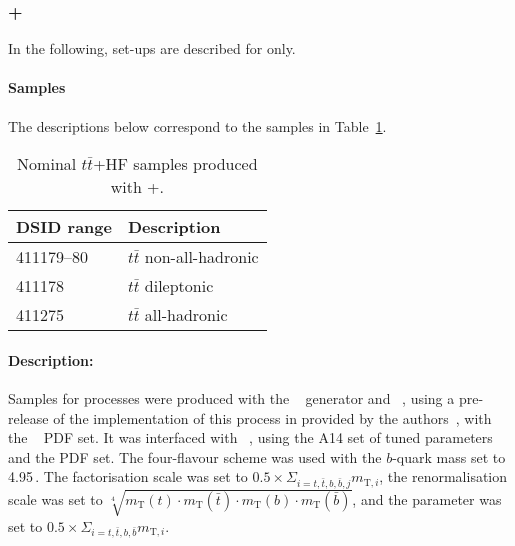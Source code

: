 \subsubsection[PowhegBoxRes+Pythia8]{\POWHEGBOXRES+\PYTHIA[8]}
In the following, set-ups are described for \PYTHIA[8] only. 

\paragraph{Samples}
The descriptions below correspond to the samples in Table~\ref{tab:ttHF_pp8}.
\begin{table}[htbp]
\begin{center}
\caption{Nominal $t\bar{t}$+HF samples produced with \POWHEGBOXRES+\PYTHIA[8]. } 
\label{tab:ttHF_pp8}
\begin{tabular}{ l | l }
\hline
DSID range & Description \\
\hline
411179--80 & $t\bar{t}$ non-all-hadronic \\
411178    & $t\bar{t}$ dileptonic \\
411275    & $t\bar{t}$ all-hadronic \\
\hline
\end{tabular}
\end{center}
\end{table}

\paragraph{Description:}

Samples for \ttHF processes were produced with the \POWHEGBOXRES~\cite{Jezo:2018yaf}
generator and \OPENLOOPS~\cite{Buccioni:2019sur,Cascioli:2011va,Denner:2016kdg}, using a pre-release 
of the implementation of this process in \POWHEGBOXRES provided by the authors~\cite{ttbbPowheg}, 
with the \NNPDF[3.0nlo]~\cite{Ball:2014uwa} PDF set. It was interfaced with \PYTHIA[8.240]~\cite{Sjostrand:2014zea},
using the A14 set of tuned parameters~\cite{ATL-PHYS-PUB-2014-021} and the \NNPDF[2.3lo] PDF set.
The four-flavour scheme was used with the $b$-quark mass set to 4.95\,\GeV.
The factorisation scale was set to $0.5\times\Sigma_{i=t,\bar{t},b,\bar{b},j}m_{\mathrm{T},i}$,
the renormalisation scale was set to $\sqrt[4]{m_{\text{T}}(t)\cdot m_{\text{T}}(\bar{t})\cdot m_{\text{T}}(b)\cdot m_{\text{T}}(\bar{b})}$,
and the \hdamp parameter was set to $0.5\times\Sigma_{i=t,\bar{t},b,\bar{b}}m_{\mathrm{T},i}$.
